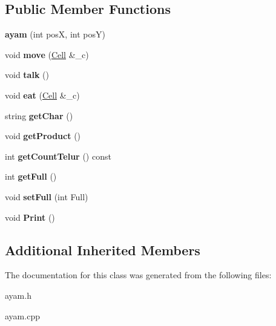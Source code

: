 \subsection*{Public Member Functions}
\begin{DoxyCompactItemize}
\item 
\mbox{\label{classayam_a1f1fdc71bbe1b0b5ff5801792c36ef03}} 
{\bfseries ayam} (int posX, int posY)
\item 
\mbox{\label{classayam_a76f01cc94965cfadc63cd5c3a3363eda}} 
void {\bfseries move} (\hyperlink{classCell}{Cell} \&\+\_\+c)
\item 
\mbox{\label{classayam_a3f93686590f6e22c28a0d36d6db0322c}} 
void {\bfseries talk} ()
\item 
\mbox{\label{classayam_a6d519dd05a51433ee85fa627a55542dc}} 
void {\bfseries eat} (\hyperlink{classCell}{Cell} \&\+\_\+c)
\item 
\mbox{\label{classayam_ab65e46952bfb77a10831258fd7b77614}} 
string {\bfseries get\+Char} ()
\item 
\mbox{\label{classayam_ad1d1fa0982aed2041aa88b9d646e6fd5}} 
void {\bfseries get\+Product} ()
\item 
\mbox{\label{classayam_ae9cd9f074f1639bf768f3336491b06a9}} 
int {\bfseries get\+Count\+Telur} () const
\item 
\mbox{\label{classayam_aa9f0e9dd312dc8ed0dcba46f94a77d9a}} 
int {\bfseries get\+Full} ()
\item 
\mbox{\label{classayam_aca2103a6a0565ab841f5bebc045f61c7}} 
void {\bfseries set\+Full} (int Full)
\item 
\mbox{\label{classayam_a7d57c663c076c3967b078209f2037de9}} 
void {\bfseries Print} ()
\end{DoxyCompactItemize}
\subsection*{Additional Inherited Members}


The documentation for this class was generated from the following files\+:\begin{DoxyCompactItemize}
\item 
ayam.\+h\item 
ayam.\+cpp\end{DoxyCompactItemize}
